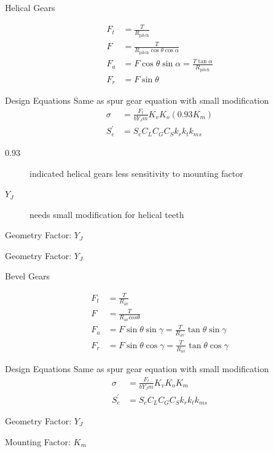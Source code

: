 \documentclass[a4paper,openany]{tufte-book}
\begin{document}
Helical Gears

\begin{align}
    F_{t} &= \frac{T}{R_{\text{pitch}}} \\
    F &= \frac{T}{R_{\text{pitch}} \cos \theta \cos \alpha} \\
    F_{a} &= F \cos \theta \sin \alpha = \frac{T \tan \alpha}{R_{\text{pitch}}} \\
    F_{r} &= F \sin \theta
  \end{align}

Design Equations Same as spur gear equation with small modification
\begin{align}
    \sigma &= \frac{F_{t}}{bY_{J}m} K_{v} K_{o} (0.93 K_{m}) \\
    S_{e}^{\prime} &= S_{e}C_{L}C_{G}C_{S}k_{r}k_{t}k_{ms}
  \end{align}

\begin{description}
\item[{0.93}] indicated helical gears less sensitivity to mounting factor

\item[{\(Y_{J}\)}] needs small modification for helical teeth
\end{description}

Geometry Factor: \(Y_{J}\)

Geometry Factor: \(Y_{J}\)

Bevel Gears

\begin{align}
        F_{t} &= \frac{T}{R_{\text{av}}} \\
        F &= \frac{T}{R_{\text{av}} cos \theta} \\
        F_{a} &= F \sin \theta \sin \gamma = \frac{T}{R_{\text{av}}} \tan \theta \sin \gamma \\
        F_{r} &= F \sin \theta \cos \gamma = \frac{T}{R_{\text{av}}} \tan \theta \cos \gamma
      \end{align}

Design Equations Same as spur gear equation with small modification
\begin{align}
    \sigma &= \frac{F_{t}}{bY_{J}m} K_{v} K_{o} K_{m} \\
    S_{e}^{\prime} &= S_{e}C_{L}C_{G}C_{S}k_{r}k_{t}k_{ms}
  \end{align}

Geometry Factor: \(Y_{J}\)

Mounting Factor: \(K_{m}\)
\end{document}
